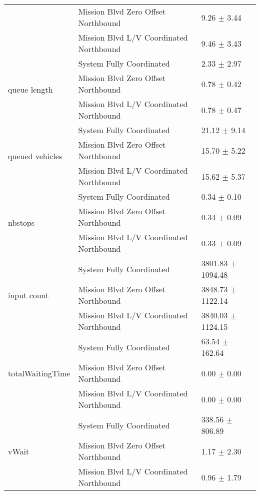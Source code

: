 \begin{tabular}{lll}
 & Mission Blvd Zero Offset Northbound & 9.26 $\pm$ 3.44 \\
 & Mission Blvd L/V Coordinated Northbound & 9.46 $\pm$ 3.43 \\
\multirow[t]{3}{*}{queue length} & System Fully Coordinated & 2.33 $\pm$ 2.97 \\
 & Mission Blvd Zero Offset Northbound & 0.78 $\pm$ 0.42 \\
 & Mission Blvd L/V Coordinated Northbound & 0.78 $\pm$ 0.47 \\
\multirow[t]{3}{*}{queued vehicles} & System Fully Coordinated & 21.12 $\pm$ 9.14 \\
 & Mission Blvd Zero Offset Northbound & 15.70 $\pm$ 5.22 \\
 & Mission Blvd L/V Coordinated Northbound & 15.62 $\pm$ 5.37 \\
\multirow[t]{3}{*}{nbstops} & System Fully Coordinated & 0.34 $\pm$ 0.10 \\
 & Mission Blvd Zero Offset Northbound & 0.34 $\pm$ 0.09 \\
 & Mission Blvd L/V Coordinated Northbound & 0.33 $\pm$ 0.09 \\
\multirow[t]{3}{*}{input count} & System Fully Coordinated & 3801.83 $\pm$ 1094.48 \\
 & Mission Blvd Zero Offset Northbound & 3848.73 $\pm$ 1122.14 \\
 & Mission Blvd L/V Coordinated Northbound & 3840.03 $\pm$ 1124.15 \\
\multirow[t]{3}{*}{totalWaitingTime} & System Fully Coordinated & 63.54 $\pm$ 162.64 \\
 & Mission Blvd Zero Offset Northbound & 0.00 $\pm$ 0.00 \\
 & Mission Blvd L/V Coordinated Northbound & 0.00 $\pm$ 0.00 \\
\multirow[t]{3}{*}{vWait} & System Fully Coordinated & 338.56 $\pm$ 806.89 \\
 & Mission Blvd Zero Offset Northbound & 1.17 $\pm$ 2.30 \\
 & Mission Blvd L/V Coordinated Northbound & 0.96 $\pm$ 1.79 \\
\bottomrule
\end{tabular}
